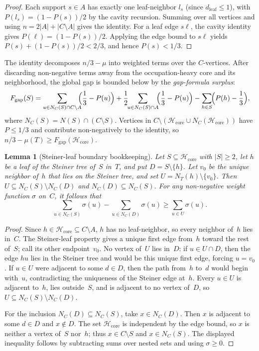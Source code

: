 \documentclass[12pt,oneside]{article}
\newtheorem{lemma}[theorem]{Lemma}
\theoremstyle{remark}
\newcommand{\dleaf}{d_{\mathrm{leaf}}}    %
\begin{document}
\begin{proof}
Each support $s \in A$ has exactly one leaf-neighbor $l_s$ (since $\dleaf \le 1$), with $P(l_s) = (1 - P(s))/2$ by the cavity recursion.
Summing over all vertices and using $n = 2|A| + |C \setminus A|$ gives the identity.
For a leaf edge $s\ell$, the cavity identity gives $P(\ell)=(1-P(s))/2$.
Applying the edge bound to $s\ell$ yields $P(s)+(1-P(s))/2<2/3$, and hence $P(s)<1/3$.
\end{proof}

The identity decomposes $n/3 - \mu$ into weighted terms over the $C$-vertices. After discarding non-negative terms away from the occupation-heavy core and its neighborhood, the global gap is bounded below by the \emph{gap-formula surplus}:
\[
  F_{\mathrm{gap}}(S)
  = \sum_{u \in N_C(S) \cap C \setminus A}\!\!\!\Bigl(\frac{1}{3} - P(u)\Bigr)
  + \frac{1}{2}\!\!\sum_{u \in N_C(S) \cap A}\!\!\Bigl(\frac{1}{3} - P(u)\Bigr)
  - \sum_{h \in S}\!\Bigl(P(h) - \frac{1}{3}\Bigr),
\]
where $N_C(S) = N(S) \cap (C \setminus S)$.
Vertices in $C \setminus (\mathcal H_{\mathrm{core}} \cup N_C(\mathcal H_{\mathrm{core}}))$ have $P \le 1/3$ and contribute non-negatively to the identity, so $n/3 - \mu(T) \ge F_{\mathrm{gap}}(\mathcal H_{\mathrm{core}})$.

\begin{lemma}[Steiner-leaf boundary bookkeeping]\label{lem:steiner-boundary}
Let $S \subseteq \mathcal H_{\mathrm{core}}$ with $|S|\ge2$, let $h$ be a leaf of the Steiner tree of~$S$ in~$T$, and put $D=S\setminus\{h\}$.
Let $v_0$ be the unique neighbor of~$h$ that lies on the Steiner tree, and set $U=N_T(h)\setminus\{v_0\}$.
Then $U\subseteq N_C(S)\setminus N_C(D)$ and $N_C(D)\subseteq N_C(S)$.
For any non-negative weight function $\sigma$ on~$C$, it follows that
\[
  \sum_{u\in N_C(S)}\sigma(u)-\sum_{u\in N_C(D)}\sigma(u)
  \ge \sum_{u\in U}\sigma(u).
\]
\end{lemma}

\begin{proof}
Since $h\in \mathcal H_{\mathrm{core}}\subseteq C\setminus A$, $h$ has no leaf-neighbor, so every neighbor of~$h$ lies in~$C$.
The Steiner-leaf property gives a unique first edge from~$h$ toward the rest of~$S$; call its other endpoint~$v_0$.
No vertex of~$U$ lies in~$D$: if $u\in U\cap D$, then the edge $hu$ lies in the Steiner tree and would be this unique first edge, forcing $u=v_0$.
If $u\in U$ were adjacent to some $d\in D$, then the path from~$h$ to~$d$ would begin with~$u$, contradicting the uniqueness of the Steiner edge at~$h$.
Every $u\in U$ is adjacent to~$h$, lies outside~$S$, and is adjacent to no vertex of~$D$, so $U\subseteq N_C(S)\setminus N_C(D)$.

For the inclusion $N_C(D)\subseteq N_C(S)$, take $x\in N_C(D)$.
Then $x$ is adjacent to some $d\in D$ and $x\notin D$.
The set $\mathcal H_{\mathrm{core}}$ is independent by the edge bound, so $x$ is neither a vertex of~$S$ nor~$h$; thus $x\in C\setminus S$ and $x\in N_C(S)$.
The displayed inequality follows by subtracting sums over nested sets and using $\sigma\ge 0$.
\end{proof}
\end{document}

